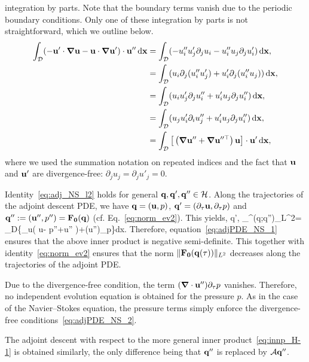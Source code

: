 \documentclass{jfm}
\begin{document}
integration by parts. Note that the boundary terms vanish due to the periodic boundary conditions.
Only one of these integration by parts is not straightforward, which we
outline below.
\begin{align*}
\int_{\mathcal D}(-\mathbf u'\cdot\mbox{\boldmath $\nabla$}\mathbf u-\mathbf u\cdot\mbox{\boldmath $\nabla$}\mathbf u')\cdot\mathbf u''\,\mathrm d\mathbf x &=
\int_{\mathcal D}(-u''_iu'_j\partial_ju_i-u''_iu_j\partial_ju'_i)\,\mathrm d\mathbf x,\\
&=\int_{\mathcal D}(u_i\partial_j(u''_iu'_j)+u'_i\partial_j(u''_iu_j))\,\mathrm d\mathbf x,\\
&=\int_{\mathcal D}(u_iu'_j\partial_ju''_i+u'_iu_j\partial_ju''_i)\,\mathrm d\mathbf x,\\
&=\int_{\mathcal D}(u_ju'_i\partial_iu''_j+u'_iu_j\partial_ju''_i)\,\mathrm d\mathbf x,\\
&=\int_{\mathcal D}\big[\left(\mbox{\boldmath $\nabla$}\mathbf u''+\mbox{\boldmath $\nabla$}\mathbf u''^\top\right)\mathbf u\big]\cdot \mathbf
u'\,\mathrm d\mathbf x,
\end{align*}
where we used the summation notation on repeated indices and the fact that $\mathbf u$ and $\mathbf u'$
are divergence-free: $\partial_ju_j=\partial_ju'_j=0$.

Identity~\eqref{eq:adj_NS_l2} holds for general $\mathbf q,\mathbf q',\mathbf q''\in\mathcal H$.
Along the trajectories of the adjoint descent PDE, we have
$\mathbf q=(\mathbf u,p)$,
$\mathbf q'=(\partial_\tau\mathbf u,\partial_\tau p)$ and
$\mathbf q'':=(\mathbf u'',p'')=\mathbf F_{\mathbf 0}(\mathbf q)$ (cf.
Eq.~\eqref{eq:norm_ev2}). This yields,
\beq
\langle\vc q', _{}^\dagger(\vc q;\vc q'')\rangle_{L^2}=
\int_{\mathcal D}\left\{\partial_\tau \vc u\cdot\left( \vc u-\bnabla
p''+\nu\Delta \vc u'' \right)+(\bnabla\cdot\vc u'')\partial_\tau p\right\}\mathrm d\vc x.
\eeq
Therefore, equation~\eqref{eq:adjPDE_NS_1} ensures that the above inner product is
negative semi-definite. This together with identity~\eqref{eq:norm_ev2} ensures that
the norm $\|\mathbf F_{\mathbf 0}(\mathbf q(\tau))\|_{L^2}$ decreases along the trajectories of the adjoint PDE.

Due to the divergence-free condition, the term $(\mbox{\boldmath $\nabla$}\cdot\mathbf u'')\partial_\tau p$
vanishes. Therefore, no independent evolution equation is obtained for the pressure $p$.
As in the case of the Navier--Stokes equation, the pressure terms simply
enforce the divergence-free conditions~\eqref{eq:adjPDE_NS_2}.

The adjoint descent with respect to the more general inner product~\eqref{eq:innp_H-1}
is obtained similarly, the only difference being that
$\mathbf q''$ is replaced by $\mathcal A\mathbf q''$.
\end{document}
